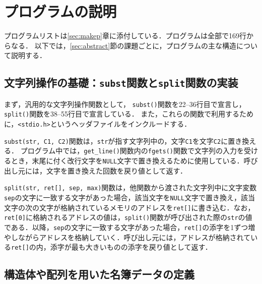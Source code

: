 \section{プログラムの説明}\label{sec:capp}

プログラムリストは\ref{sec:makep}章に添付している．プログラムは全部で169行からなる．
以下では，\ref{sec:abstract}節の課題ごとに，プログラムの主な構造について説明する．

\subsection{文字列操作の基礎：\texttt{subst}関数と\texttt{split}関数の実装}

まず，汎用的な文字列操作関数として，
\verb|subst()|関数を22--36行目で宣言し，
\verb|split()|関数を38--55行目で宣言している．
また，これらの関数で利用するために，\verb|<stdio.h>|というヘッダファイルをインクルードする．

\verb|subst(str, C1, C2)|関数は，\verb|str|が指す文字列中の，文字\verb|C1|を文字\verb|C2|に置き換える．
プログラム中では，\verb|get_line()|関数内の\verb|fgets()|関数で文字列の入力を受けるとき，末尾に付く改行文字を\verb|NULL|文字で置き換えるために使用している．呼び出し元には，文字を置き換えた回数を戻り値として返す．

\verb|split(str, ret[], sep, max)|関数は，他関数から渡された文字列中に文字変数\verb|sep|の文字に一致する文字があった場合，該当文字を\verb|NULL|文字で置き換え，該当文字の次の文字が格納されているメモリのアドレスを\verb|ret[]|に書き込む．なお，\verb|ret[0]|に格納されるアドレスの値は，\verb|split()|関数が呼び出された際の\verb|str|の値である．以降，\verb|sep|の文字に一致する文字があった場合，\verb|ret[]|の添字を1ずつ増やしながらアドレスを格納していく．呼び出し元には，アドレスが格納されている\verb|ret[]|の内，添字が最も大きいものの添字を戻り値として返す．

\subsection{構造体や配列を用いた名簿データの定義}

